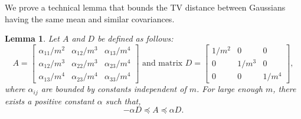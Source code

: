 \documentclass[10pt]{article} %
\theoremstyle{plain}
\newtheorem{lemma}[theorem]{Lemma}
\begin{document}
We prove a technical lemma that bounds the TV distance between Gaussians having the same mean and similar covariances.
\begin{lemma}\label{lem:lower_bound}
	Let $A$ and $D$ be defined as follows: 
	$$A=\begin{bmatrix}
		\alpha_{11}/m^2 & \alpha_{12}/m^3 & \alpha_{13}/m^4\\
		\alpha_{12}/m^3 & \alpha_{22}/m^3 & \alpha_{23}/m^4 \\
		\alpha_{13}/m^4 & \alpha_{23}/m^4 & \alpha_{33}/m^4
	\end{bmatrix} \text{ and matrix }D=\begin{bmatrix}
		1/m^2 & 0 & 0\\
		0 & 1/m^3 & 0 \\
		0 & 0 & 1/m^4
	\end{bmatrix},$$ where $\alpha_{ij}$ are bounded by constants independent of $m$. For large enough $m$, there exists a positive constant $\alpha$ such that,
	$$-\alpha D \preceq A \preceq \alpha D.$$
\end{lemma}
\end{document}
